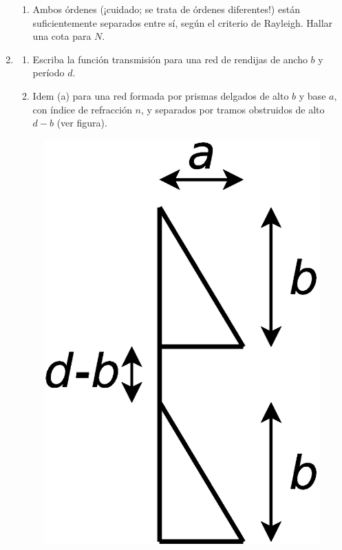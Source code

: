 \documentclass[11pt,spanish]{article}
\begin{document}
\begin{enumerate}
\begin{enumerate}
        \item Ambos órdenes (¡cuidado; se trata de órdenes diferentes!) están
        suficientemente separados entre sí, según el criterio de Rayleigh.
        Hallar una cota para $N$.
    \end{enumerate}


    \item 

    \begin{enumerate}
        \item Escriba la función transmisión para una red de rendijas de ancho 
        $b$ y período $d$.

        \item Idem (a) para una red formada por prismas delgados de alto $b$ y
        base $a$, con índice de refracción $n$, y separados por tramos obstruidos
        de alto $d-b$ (ver figura).
    \end{enumerate}
    
    \begin{figure}[H]
        \centering{}
        \includegraphics[clip,scale=0.3]{figs/ej5-44}
    \end{figure}


\end{enumerate}
\end{document}
